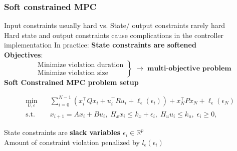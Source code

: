 \subsubsection{Soft constrained MPC}
    Input constraints usually hard vs. State/ output constraints rarely hard\\
    \rightarrow Hard state and output constraints cause complications in the controller implementation
    \Rightarrow In practice: \textbf{State constraints are softened}\\
    \textbf{Objectives}:
\[
\left.
\begin{aligned}
&\text{Minimize violation duration}\\
&\text{Minimize violation size}
\end{aligned}
\right\}
\;\rightarrow\;
\textbf{multi-objective problem}
\]
    \textbf{Soft Constrained MPC problem setup}\\

\begin{tcolorbox}[eqbox]
\begin{align*}
\min_{U,\epsilon}\quad &
\sum_{i=0}^{N-1}\!\left(x_i^\top Qx_i+u_i^\top Ru_i+
\ell_\epsilon(\epsilon_i)\right)
+x_N^\top Px_N+\ell_\epsilon(\epsilon_N)\\[-1mm]
\text{s.t.}\quad &
x_{i+1}=Ax_i+Bu_i,\;
H_xx_i\leq k_x+\epsilon_i,\;
H_uu_i\leq k_u,\;
\epsilon_i\geq0,
\end{align*}
\end{tcolorbox}

    

    \rightarrow State constraints are \textbf{slack variables $\epsilon_i\in\mathbb{R}^p$}\\
    \rightarrow Amount of constraint violation penalized by $l_\epsilon(\epsilon_i)$\\

